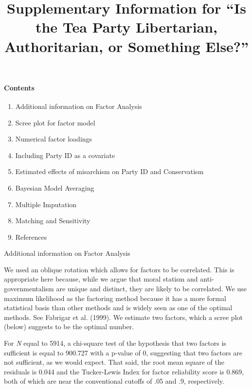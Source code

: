 \documentclass[12pt,]{article}
\title{Supplementary Information for ``Is the Tea Party Libertarian, Authoritarian, or Something Else?''
\vspace{1.25em}}
\author{}
\date{}
\begin{document}
\maketitle

\paragraph{Contents}\label{contents}

\begin{enumerate}
\def\labelenumi{\arabic{enumi}.}
\itemsep1pt\parskip0pt
\item
Additional information on Factor Analysis
\item
  Scree plot for factor model
\item
  Numerical factor loadings
\item
  Including Party ID as a covariate
\item
  Estimated effects of misarchism on Party ID and Conservatism
\item
Bayesian Model Averaging
\item
Multiple Imputation
\item
Matching and Sensitivity
\item
References
\end{enumerate}

Additional information on Factor Analysis

We used an oblique rotation which allows for factors to be correlated. This is
  appropriate here because, while we argue that moral statism and
  anti-governmentalism are unique and distinct, they are likely to be
  correlated. We use maximum likelihood as the factoring method because
  it has a more formal statistical basis than other methods and is
  widely seen as one of the optimal methods. See Fabrigar et al. (1999). We estimate two factors, which a scree plot (below) suggests to be the optimal number.
  
  For \emph{N} equal to 5914, a chi-square test of the hypothesis that two factors is
  sufficient is equal to 900.727 with a p-value of 0, suggesting that
  two factors are not sufficient, as we would expect. That said, the
  root mean square of the residuals is 0.044 and the Tucker-Lewis Index
  for factor reliability score is 0.869, both of which are near the
  conventional cutoffs of .05 and .9, respectively.
\end{document}
